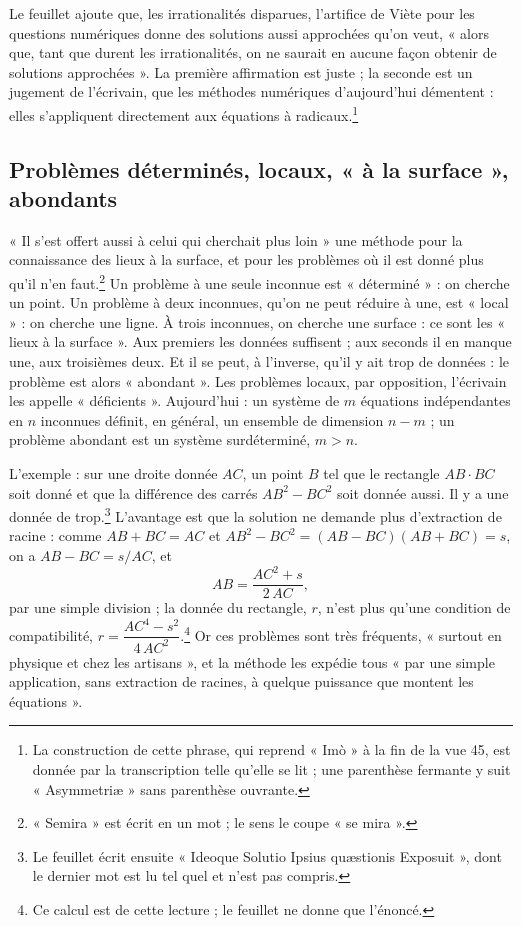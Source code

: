 \documentclass[11pt,a4paper]{article}
\begin{document}
Le feuillet ajoute que, les irrationalités disparues, l'artifice de Viète
pour les questions numériques donne des solutions aussi approchées qu'on veut,
« alors que, tant que durent les irrationalités, on ne saurait en aucune façon
obtenir de solutions approchées ». La première affirmation est juste ; la
seconde est un jugement de l'écrivain, que les méthodes numériques d'aujourd'hui
démentent : elles s'appliquent directement aux équations à radicaux.\footnote{La
construction de cette phrase, qui reprend « Imò » à la fin de la vue 45, est
donnée par la transcription telle qu'elle se lit ; une parenthèse fermante y
suit « Asymmetriæ » sans parenthèse ouvrante.}

\subsection*{Problèmes déterminés, locaux, « à la surface », abondants}

« Il s'est offert aussi à celui qui cherchait plus loin » une méthode pour la
connaissance des lieux à la surface, et pour les problèmes où il est donné plus
qu'il n'en faut.\footnote{« Semira » est écrit en un mot ; le sens le coupe
« se mira ».} Un problème à une seule inconnue est « déterminé » : on cherche
un point. Un problème à deux inconnues, qu'on ne peut réduire à une, est
« local » : on cherche une ligne. À trois inconnues, on cherche une surface :
ce sont les « lieux à la surface ». Aux premiers les données suffisent ; aux
seconds il en manque une, aux troisièmes deux. Et il se peut, à l'inverse,
qu'il y ait trop de données : le problème est alors « abondant ». Les
problèmes locaux, par opposition, l'écrivain les appelle « déficients ».
Aujourd'hui : un système de $m$ équations indépendantes en $n$ inconnues
définit, en général, un ensemble de dimension $n - m$ ; un problème abondant
est un système surdéterminé, $m > n$.

L'exemple : sur une droite donnée $AC$, un point $B$ tel que le rectangle
$AB\cdot BC$ soit donné et que la différence des carrés $AB^2 - BC^2$ soit donnée
aussi. Il y a une donnée de trop.\footnote{Le feuillet écrit ensuite « Ideoque
Solutio Ipsius quæstionis Exposuit », dont le dernier mot est lu tel quel et
n'est pas compris.} L'avantage est que la solution ne demande plus
d'extraction de racine : comme $AB + BC = AC$ et
$AB^2 - BC^2 = (AB - BC)(AB + BC) = s$, on a $AB - BC = s/AC$, et
\[ AB = \frac{AC^2 + s}{2\,AC} , \]
par une simple division ; la donnée du rectangle, $r$, n'est plus qu'une
condition de compatibilité, $r = \dfrac{AC^4 - s^2}{4\,AC^2}$.\footnote{Ce calcul
est de cette lecture ; le feuillet ne donne que l'énoncé.} Or ces problèmes
sont très fréquents, « surtout en physique et chez les artisans », et la
méthode les expédie tous « par une simple application, sans extraction de
racines, à quelque puissance que montent les équations ».
\end{document}
